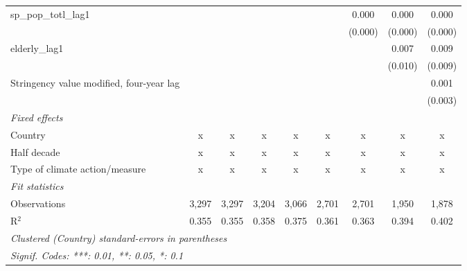 \begin{tabular}{lcccccccc}
   sp\_pop\_totl\_lag1                            &               &               &               &               &             & 0.000   & 0.000   & 0.000\\   
                                                  &               &               &               &               &             & (0.000) & (0.000) & (0.000)\\   
   elderly\_lag1                                  &               &               &               &               &             &         & 0.007   & 0.009\\   
                                                  &               &               &               &               &             &         & (0.010) & (0.009)\\   
   Stringency value modified, four-year lag       &               &               &               &               &             &         &         & 0.001\\   
                                                  &               &               &               &               &             &         &         & (0.003)\\   
   \emph{Fixed effects}\\
   Country                                        & x             & x             & x             & x             & x           & x       & x       & x\\  
   Half decade                                    & x             & x             & x             & x             & x           & x       & x       & x\\  
   Type of climate action/measure                 & x             & x             & x             & x             & x           & x       & x       & x\\  
   \midrule \emph{Fit statistics}\\
   Observations                                   & 3,297         & 3,297         & 3,204         & 3,066         & 2,701       & 2,701   & 1,950   & 1,878\\  
   R$^2$                                          & 0.355         & 0.355         & 0.358         & 0.375         & 0.361       & 0.363   & 0.394   & 0.402\\  
   \midrule
   \multicolumn{9}{l}{\emph{Clustered (Country) standard-errors in parentheses}}\\
   \multicolumn{9}{l}{\emph{Signif. Codes: ***: 0.01, **: 0.05, *: 0.1}}\\
\end{tabular}
\par\endgroup


